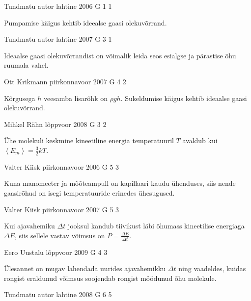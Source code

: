 \documentclass[11pt, twoside]{article}
\begin{document}
{%
{Tundmatu autor} %
{lahtine} %
{2006} %
{G 1} %
{1} %
{

\ifHint
Pumpamise käigus kehtib ideealse gaasi olekuvõrrand.
\fi
}

{Tundmatu autor} %
{lahtine} %
{2007} %
{G 3} %
{1} %
{

\ifHint
Ideaalse gaasi olekuvõrrandist on võimalik leida seos esialgse ja pärastise õhu ruumala vahel.
\fi
}

{Ott Krikmann} %
{piirkonnavoor} %
{2007} %
{G 4} %
{2} %
{

\ifHint
Kõrgusega $h$ veesamba lisarõhk on $\rho gh$. Sukeldumise käigus kehtib ideaalse gaasi olekuvõrrand.
\fi
}

{Mihkel Rähn} %
{lõppvoor} %
{2008} %
{G 3} %
{2} %
{

\ifHint
Ühe molekuli keskmine kineetiline energia temperatuuril $T$ avaldub kui $\left\langle E_{m}\right\rangle=\frac{3}{2} k T$.
\fi
}

{Valter Kiisk} %
{piirkonnavoor} %
{2006} %
{G 5} %
{3} %
{

\ifHint
Kuna manomeeter ja mõõteampull on kapillaari kaudu ühenduses, siis nende gaasirõhud on isegi temperatuuride erinedes ühesugused.
\fi
}

{Valter Kiisk} %
{piirkonnavoor} %
{2007} %
{G 5} %
{3} %
{

\ifHint
Kui ajavahemiku $\Delta t$ jooksul kandub tiivikust läbi õhumass kineetilise energiaga $\Delta E$, siis sellele vastav võimsus on $P = \frac{\Delta E}{\Delta t}$.
\fi
}

{Eero Uustalu} %
{lõppvoor} %
{2009} %
{G 4} %
{3} %
{

\ifHint
Ülesannet on mugav lahendada uurides ajavahemikku $\Delta t$ ning vaadeldes, kuidas rongist eraldunud võimsus soojendab rongist möödunud õhu molekule.
\fi
}

{Tundmatu autor} %
{lahtine} %
{2008} %
{G 6} %
{5} %
{

}}
\end{document}
